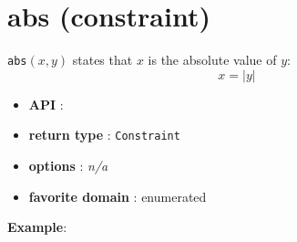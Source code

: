 \section{abs (constraint)}\label{abs:absconstraint}\hypertarget{abs:absconstraint}{}
\begin{notedef}
  \texttt{abs}$(x,y)$ states that $x$ is the absolute value of $y$:
$$x = |y|$$
\end{notedef}

\begin{itemize}
	\item \textbf{API} : 
	\item \textbf{return type} : \texttt{Constraint}
	\item \textbf{options} : \emph{n/a}
	\item \textbf{favorite domain} : enumerated
\end{itemize}

\textbf{Example}:



